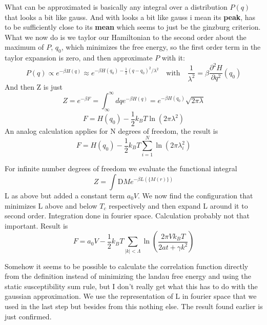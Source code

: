 	What can be approximated is basically any integral over a distribution $P(q)$ that looks a bit like gauss. And with looks a bit like gauss i mean its \textbf{peak}, has to be sufficiently close to its \textbf{mean} which seems to just be the ginzburg criterion. What we now do is we taylor our Hamiltonian to the second order about the maximum of $P$, $q_0$, which minimizes the free energy, so the first order term in the taylor expansion is zero, and then approximate $P$ with it:
	\begin{equation}
		P(q) \propto e^{-\beta H(q)} \approx e^{-\beta H(q_0) - \frac{1}{2} (q - q_0)^2 / \lambda^2} \quad \text{with} \quad \frac{1}{\lambda^2} =	\beta \frac{\partial^2 H}{\partial q^2}(q_0)
	\end{equation}
	And then Z is just
	\begin{equation}
		Z =	e^{-\beta F} = \int_{\infty}^{\infty} dq e^{-\beta H(q)} =	e^{-\beta H(q_0)} \sqrt{2 \pi \lambda}
	\end{equation}
	\begin{equation}
		F =	H(q_0) - \frac{1}{2} k_B T \ln(2 \pi \lambda^2)
	\end{equation}
	An analog calculation applies for N degrees of freedom, the result is
	\begin{equation}
		F =	H(q_0) -\frac{1}{2} k_B T \sum_{i = 1}^{N}\ln(2\pi \lambda_i^2)
	\end{equation}
	
	For infinite number degrees of freedom we evaluate the functional integral
	\begin{equation}
		Z =	\int \text{D}M e^{-\beta L(\lbrace M(r)\rbrace)}
	\end{equation}
	L as above but added a constant term $a_0 V$. We now find the configuration that minimizes L	above and below $T_c$ respectively and then expand L around it to second order. Integration done in fourier space. Calculation probably not that important. Result is
	\begin{equation}
		F =	a_0 V - \frac{1}{2} k_B T \sum_{|k| < \Lambda}^{} \ln \left(\frac{2 \pi V k_B T}{2at + \gamma k^2}\right)
	\end{equation}
	
	Somehow it seems to be possible to calculate the correlation function directly from the definition instead of minimizing the landau free energy and using the static susceptibility sum rule, but I	don't really get what this has to do with the gaussian approximation. We use the representation of L	in fourier space that we used in the last step but besides from this nothing else. The result found earlier is just confirmed.
	
